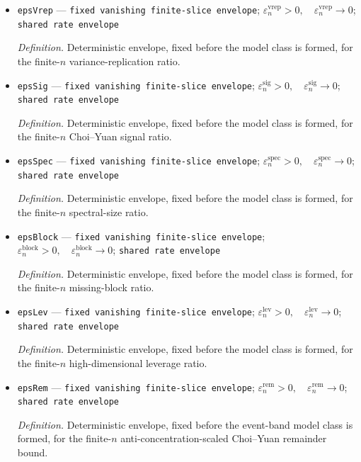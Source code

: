 \documentclass{article}
\begin{document}
\begin{itemize}
  \item \texttt{epsVrep} --- \texttt{fixed vanishing finite-\allowbreak{}slice envelope}; \(\varepsilon_n^{\mathrm{vrep}}>0,\quad \varepsilon_n^{\mathrm{vrep}}\to0\); \texttt{shared rate envelope}
  \par\smallskip\noindent\emph{Definition.} Deterministic envelope, fixed before the model class is formed, for the finite-\(n\) variance-replication ratio.
  \item \texttt{epsSig} --- \texttt{fixed vanishing finite-\allowbreak{}slice envelope}; \(\varepsilon_n^{\mathrm{sig}}>0,\quad \varepsilon_n^{\mathrm{sig}}\to0\); \texttt{shared rate envelope}
  \par\smallskip\noindent\emph{Definition.} Deterministic envelope, fixed before the model class is formed, for the finite-\(n\) Choi--Yuan signal ratio.
  \item \texttt{epsSpec} --- \texttt{fixed vanishing finite-\allowbreak{}slice envelope}; \(\varepsilon_n^{\mathrm{spec}}>0,\quad \varepsilon_n^{\mathrm{spec}}\to0\); \texttt{shared rate envelope}
  \par\smallskip\noindent\emph{Definition.} Deterministic envelope, fixed before the model class is formed, for the finite-\(n\) spectral-size ratio.
  \item \texttt{epsBlock} --- \texttt{fixed vanishing finite-\allowbreak{}slice envelope}; \(\varepsilon_n^{\mathrm{block}}>0,\quad \varepsilon_n^{\mathrm{block}}\to0\); \texttt{shared rate envelope}
  \par\smallskip\noindent\emph{Definition.} Deterministic envelope, fixed before the model class is formed, for the finite-\(n\) missing-block ratio.
  \item \texttt{epsLev} --- \texttt{fixed vanishing finite-\allowbreak{}slice envelope}; \(\varepsilon_n^{\mathrm{lev}}>0,\quad \varepsilon_n^{\mathrm{lev}}\to0\); \texttt{shared rate envelope}
  \par\smallskip\noindent\emph{Definition.} Deterministic envelope, fixed before the model class is formed, for the finite-\(n\) high-dimensional leverage ratio.
  \item \texttt{epsRem} --- \texttt{fixed vanishing finite-\allowbreak{}slice envelope}; \(\varepsilon_n^{\mathrm{rem}}>0,\quad \varepsilon_n^{\mathrm{rem}}\to0\); \texttt{shared rate envelope}
  \par\smallskip\noindent\emph{Definition.} Deterministic envelope, fixed before the event-band model class is formed, for the finite-\(n\) anti-concentration-scaled Choi--Yuan remainder bound.

\end{itemize}
\end{document}
